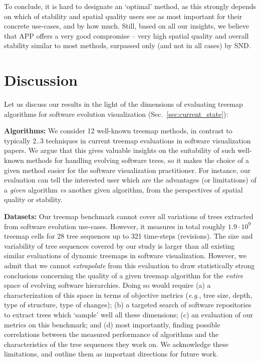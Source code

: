 To conclude, it is hard to designate an `optimal' method, as this strongly depends on which of stability and spatial quality users see as most important for their concrete use-cases, and by how much. Still, based on all our insights, we believe that APP offers a very good compromise -- very high spatial quality and overall stability similar to most methods, surpassed only (and not in all cases) by SND.


\section{Discussion}
\label{sec:init-discussion}
%
%
Let us discuss our results in the light of the dimensions of evaluating treemap algorithms for software evolution visualization (Sec.~\ref{sec:current_state}):

\noindent\textbf{Algorithms:} We consider 12 well-known treemap methods, in contrast to typically 2..3 techniques in current treemap evaluations in software visualization papers. We argue that this gives valuable insights on the suitability of such well-known methods for handling evolving software trees, so it makes the choice of a given method easier for the software visualization practitioner. For instance, our evaluation can tell the interested user which are the advantages (or limitations) of a \emph{given} algorithm \emph{vs} another given algorithm, from the perspectives of spatial quality or stability.

\noindent\textbf{Datasets:} Our treemap benchmark cannot cover all variations of trees extracted from software evolution use-cases. However, it measures in total roughly $1.9 \cdot 10^{9}$ treemap cells for 28 tree sequences up to 321 time-steps (revisions). The size and variability of tree sequences covered by our study is larger than all existing similar evaluations of dynamic treemaps in software visualization. However, we admit that we cannot \emph{extrapolate} from this evaluation to draw statistically strong conclusions concerning the quality of a given treemap algorithm for the \emph{entire} space of evolving software hierarchies. Doing so would require (a) a characterization of this space in terms of objective metrics (\emph{e.g.}, tree size, depth, type of structure, type of changes); (b) a targeted search of software repositories to extract trees which `sample' well all these dimensions; (c) an evaluation of our metrics on this benchmark; and (d) most importantly, finding possible correlations between the measured performance of algorithms and the characteristics of the tree sequences they work on. We acknowledge these limitations, and outline them as important directions for future work.

